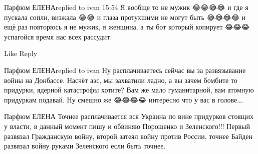  
 
 
 
 


Парфюм ЕЛЕНАreplied to ivan
15:54
Я вообще то не мужик 😂😂😂😂 и где я пускала сопли, визжала 😂😂 и глаза протухшими не могут быть 😂😂😂😂 и ещё раз повторюсь я не мужик, я женщина, а ты бот который копирует 😂😂😂 успагойся время нас всех рассудит.

    Like
    Reply

Парфюм ЕЛЕНАreplied to ivan
Ну расплачиваетесь сейчас вы за развязывание войны на Донбассе. Насчёт аэс, мы захватили ладно, а вы зачем бомбите то придурки, ядерной катастрофы хотите? Вам же мало гуманитарной, вам атомную придуркам подавай. Ну смешно же 😂😂😂😂 интересно что у вас в голове….

Парфюм ЕЛЕНА
Точнее расплачивается вся Украина по вине придурков стоящих у власти, в данный момент пишу и обвиняю Порошенко и Зеленского!!! Первый развязал Гражданскую войну, второй затеял войну против России, точнее Байден развязал войну руками Зеленского если быть точнее.
